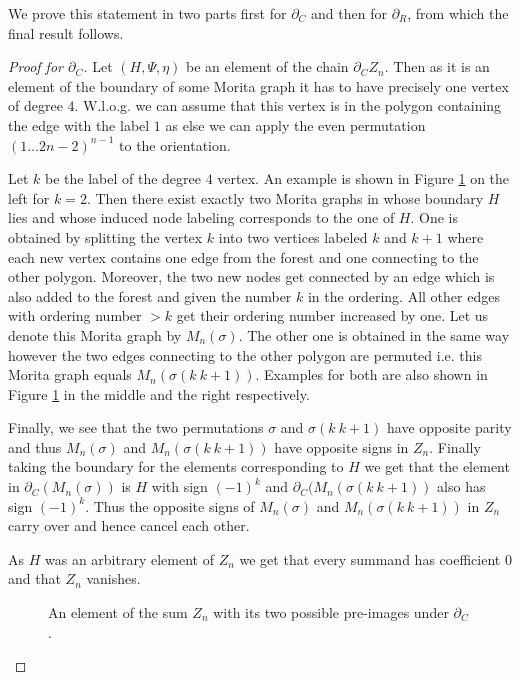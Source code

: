 We prove this statement in two parts first for $\partial_{C}$ and then for $\partial_{R}$, from which the final result follows.
\begin{proof}[Proof for $\partial_C$]
	Let $(H,\Psi,\eta)$ be an element of the chain $\partial_{C} Z_{n}$.
	Then as it is an element of the boundary of some Morita graph it has to
	have precisely one vertex of degree $4$. W.l.o.g. we can assume that this vertex is in the polygon containing the 
	edge with the label $1$ as else we can apply the even permutation $(1 \ldots 2n-2)^{n-1}$ to the orientation.

	Let $k$ be the label of the degree $4$ vertex. An example is shown in Figure \ref{fig:MoritaCycleDC} on the left for $k = 2$. 
	Then there exist exactly two Morita graphs in whose boundary $H$ lies and whose induced node labeling corresponds to the one of $H$.
	One is obtained by splitting the vertex $k$ into two vertices labeled $k$ and $k+1$ where each new vertex contains one edge from the forest and one connecting to the other polygon.
	Moreover, the two new nodes get connected by an edge which is also added to the forest and given the number $k$ in the ordering.
	All other edges with ordering number  $> k $ get their ordering number increased by one. Let us denote this Morita graph by $M_{n}(\sigma)$.
	The other one is obtained in the same way however the two edges connecting to the other polygon are permuted i.e.
	this Morita graph equals $M_{n}(\sigma(k\ k+1))$.
	Examples for both are also shown in Figure \ref{fig:MoritaCycleDC} in the middle and the right respectively.

	Finally, we see that the two permutations $\sigma$ and $\sigma (k\ k+1)$ have opposite parity and thus $M_{n}(\sigma)$ and $M_{n}(\sigma (k\ k+1))$ have
	opposite signs in $Z_{n}$. Finally taking the boundary for the elements corresponding to $H$ we get that
	the element in $\partial_{C}(M_{n}(\sigma))$ is $H$ with sign $(-1)^{k}$ and $\partial_{C}(M_{n}(\sigma (k\ k+1))$ also has sign $(-1)^{k}$.
	Thus the opposite signs of $M_{n}(\sigma)$ and $M_{n}(\sigma (k\ k+1))$ in $Z_{n}$ carry over and  hence cancel each other.

	As $H$ was an arbitrary element of $Z_{n}$ we get that every summand has coefficient $0$ and that $Z_{n}$ vanishes.
	\begin{figure}[hp]
		\centering
		\caption{An element of the sum $Z_{n}$ with its two possible pre-images under $\partial_{C}$.}
		\label{fig:MoritaCycleDC}
	\end{figure}
\end{proof}

